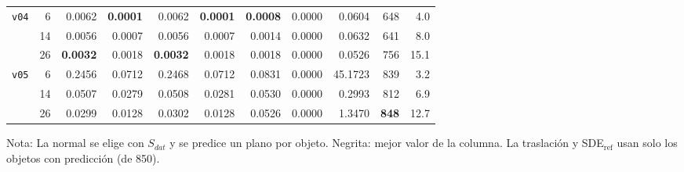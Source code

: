 \begin{table}[htbp]
\begin{lrbox}{\tablebox}
\begin{adjustbox}{max width=\textwidth}
\begin{tabular}{lrrrrrrrrrr}
\midrule
\multirow{3}{*}{\texttt{v04}} & 6 & 0.0062 & \textbf{0.0001} & 0.0062 & \textbf{0.0001} & \textbf{0.0008} & 0.0000 & 0.0604 & 648 & 4.0 \\
 & 14 & 0.0056 & 0.0007 & 0.0056 & 0.0007 & 0.0014 & 0.0000 & 0.0632 & 641 & 8.0 \\
 & 26 & \textbf{0.0032} & 0.0018 & \textbf{0.0032} & 0.0018 & 0.0018 & 0.0000 & 0.0526 & 756 & 15.1 \\
\midrule
\multirow{3}{*}{\texttt{v05}} & 6 & 0.2456 & 0.0712 & 0.2468 & 0.0712 & 0.0831 & 0.0000 & 45.1723 & 839 & 3.2 \\
 & 14 & 0.0507 & 0.0279 & 0.0508 & 0.0281 & 0.0530 & 0.0000 & 0.2993 & 812 & 6.9 \\
 & 26 & 0.0299 & 0.0128 & 0.0302 & 0.0128 & 0.0526 & 0.0000 & 1.3470 & \textbf{848} & 12.7 \\
\bottomrule
\end{tabular}
\end{adjustbox}
\end{lrbox}
\usebox{\tablebox}

\vspace{1.5ex}
\begin{minipage}{\wd\tablebox}
\footnotesize
Nota: La normal se elige con $S_{dat}$ y se predice un plano por objeto. Negrita: mejor valor de la columna. La traslación y SDE$_{\mathrm{ref}}$ usan solo los objetos con predicción (de 850).
\end{minipage}
\end{table}

\clearpage

